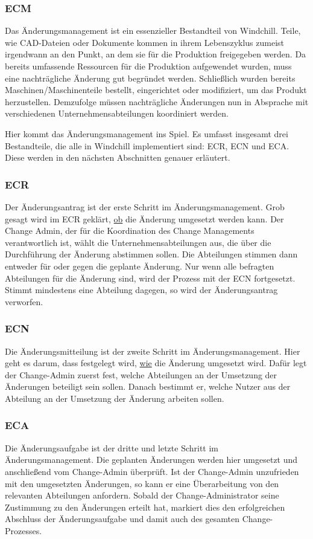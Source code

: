 \subsubsection{\acl{ECM}}
Das Änderungsmanagement ist ein essenzieller Bestandteil von Windchill.
Teile, wie \zB CAD-Dateien oder Dokumente kommen in ihrem Lebenszyklus zumeist irgendwann an den Punkt, an dem sie für die Produktion freigegeben werden.
Da bereits umfassende Ressourcen für die Produktion aufgewendet wurden, muss eine nachträgliche Änderung gut begründet werden.
Schließlich wurden bereits Maschinen/Maschinenteile bestellt, eingerichtet oder modifiziert, um das Produkt herzustellen.
Demzufolge müssen nachträgliche Änderungen nun in Absprache mit verschiedenen Unternehmensabteilungen koordiniert werden.

Hier kommt das Änderungsmanagement ins Spiel.
Es umfasst insgesamt drei Bestandteile, die alle in Windchill implementiert sind: \acl{ECR}, \acl{ECN} und \acl{ECA}.
Diese werden in den nächsten Abschnitten genauer erläutert.

\subsubsection{\acl{ECR}}
Der Änderungsantrag ist der erste Schritt im Änderungsmanagement.
Grob gesagt wird im \ac{ECR} geklärt, \underline{ob} die Änderung umgesetzt werden kann.
Der Change Admin, der für die Koordination des Change Managements verantwortlich ist, wählt die Unternehmensabteilungen aus, die über die Durchführung der Änderung abstimmen sollen.
Die Abteilungen stimmen dann entweder für oder gegen die geplante Änderung.
Nur wenn alle befragten Abteilungen für die Änderung sind, wird der Prozess mit der \ac{ECN} fortgesetzt.
Stimmt mindestens eine Abteilung dagegen, so wird der Änderungsantrag verworfen.

\subsubsection{\acl{ECN}}
Die Änderungsmitteilung ist der zweite Schritt im Änderungsmanagement.
Hier geht es darum, dass festgelegt wird, \underline{wie} die Änderung umgesetzt wird.
Dafür legt der Change-Admin zuerst fest, welche Abteilungen an der Umsetzung der Änderungen beteiligt sein sollen.
Danach bestimmt er, welche Nutzer aus der Abteilung an der Umsetzung der Änderung arbeiten sollen.

\subsubsection{\acl{ECA}}
Die Änderungsaufgabe ist der dritte und letzte Schritt im Änderungsmanagement.
Die geplanten Änderungen werden hier umgesetzt und anschließend vom Change-Admin überprüft.
Ist der Change-Admin unzufrieden mit den umgesetzten Änderungen, so kann er eine Überarbeitung von den relevanten Abteilungen anfordern.
Sobald der Change-Administrator seine Zustimmung zu den Änderungen erteilt hat, markiert dies den erfolgreichen Abschluss der Änderungsaufgabe und damit auch des gesamten Change-Prozesses.

